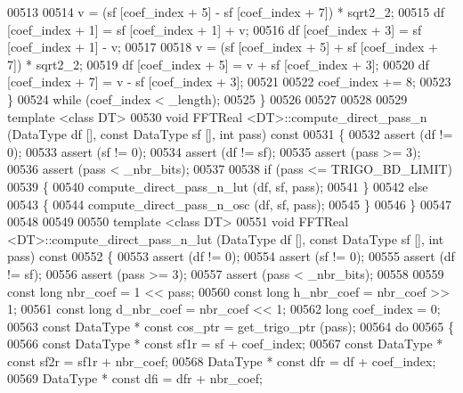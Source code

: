 \begin{DoxyCode}
00513 
00514         v = (sf [coef\_index + 5] - sf [coef\_index + 7]) * sqrt2\_2;
00515         df [coef\_index + 1] = sf [coef\_index + 1] + v;
00516         df [coef\_index + 3] = sf [coef\_index + 1] - v;
00517 
00518         v = (sf [coef\_index + 5] + sf [coef\_index + 7]) * sqrt2\_2;
00519         df [coef\_index + 5] = v + sf [coef\_index + 3];
00520         df [coef\_index + 7] = v - sf [coef\_index + 3];
00521 
00522         coef\_index += 8;
00523     \}
00524     \textcolor{keywordflow}{while} (coef\_index < \_length);
00525 \}
00526 
00527 
00528 
00529 \textcolor{keyword}{template} <\textcolor{keyword}{class} DT>
00530 \textcolor{keywordtype}{void}    FFTReal <DT>::compute\_direct\_pass\_n (DataType df [], \textcolor{keyword}{const} DataType sf [], \textcolor{keywordtype}{int} pass) \textcolor{keyword}{const}
00531 \{
00532     assert (df != 0);
00533     assert (sf != 0);
00534     assert (df != sf);
00535     assert (pass >= 3);
00536     assert (pass < \_nbr\_bits);
00537 
00538     \textcolor{keywordflow}{if} (pass <= TRIGO\_BD\_LIMIT)
00539     \{
00540         compute\_direct\_pass\_n\_lut (df, sf, pass);
00541     \}
00542     \textcolor{keywordflow}{else}
00543     \{
00544         compute\_direct\_pass\_n\_osc (df, sf, pass);
00545     \}
00546 \}
00547 
00548 
00549 
00550 \textcolor{keyword}{template} <\textcolor{keyword}{class} DT>
00551 \textcolor{keywordtype}{void}    FFTReal <DT>::compute\_direct\_pass\_n\_lut (DataType df [], \textcolor{keyword}{const} DataType sf [], \textcolor{keywordtype}{int} pass) \textcolor{keyword}{const}
00552 \{
00553     assert (df != 0);
00554     assert (sf != 0);
00555     assert (df != sf);
00556     assert (pass >= 3);
00557     assert (pass < \_nbr\_bits);
00558 
00559     \textcolor{keyword}{const} \textcolor{keywordtype}{long}      nbr\_coef = 1 << pass;
00560     \textcolor{keyword}{const} \textcolor{keywordtype}{long}      h\_nbr\_coef = nbr\_coef >> 1;
00561     \textcolor{keyword}{const} \textcolor{keywordtype}{long}      d\_nbr\_coef = nbr\_coef << 1;
00562     \textcolor{keywordtype}{long}                coef\_index = 0;
00563     \textcolor{keyword}{const} DataType  * \textcolor{keyword}{const} cos\_ptr = get\_trigo\_ptr (pass);
00564     \textcolor{keywordflow}{do}
00565     \{
00566         \textcolor{keyword}{const} DataType  * \textcolor{keyword}{const} sf1r = sf + coef\_index;
00567         \textcolor{keyword}{const} DataType  * \textcolor{keyword}{const} sf2r = sf1r + nbr\_coef;
00568         DataType            * \textcolor{keyword}{const} dfr = df + coef\_index;
00569         DataType            * \textcolor{keyword}{const} dfi = dfr + nbr\_coef;

\end{DoxyCode}
